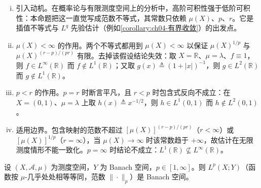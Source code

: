 \documentclass[../../main.tex]{subfiles}%
\begin{document}
\begin{remark}
\begin{enumerate}[(i)]
\item 引入动机。在概率论与有限测度空间上的分析中，高阶可积性强于低阶可积性：本命题把这一直觉写成范数不等式，其常数只依赖 $\mu(X)$、$p$、$r$。它是插值不等式与 $L^q$ 先验估计（例如\cref{corollary:ch04-有界收敛}）的出发点。

\item $\mu(X)<\infty$ 的作用。两个不等式都用到 $\mu(X)<\infty$ 以保证 $\mu(X)^{1/p}$ 与 $\mu(X)^{(r-p)/(pr)}$ 有限。去掉该假设结论失效：取 $X=\mathbb{R}$、$\mu=\lambda$、$f\equiv1$，则 $f\in L^\infty(\mathbb{R})$ 而 $f\notin L^1(\mathbb{R})$；又取 $g(x)\triangleq(1+|x|)^{-1}$，则 $g\in L^2(\mathbb{R})$ 而 $g\notin L^1(\mathbb{R})$。

\item $p<r$ 的作用。$p=r$ 时断言平凡，且 $r<p$ 时包含式反向不成立：在 $X=(0,1)$、$\mu=\lambda$ 上取 $h(x)\triangleq x^{-1/2}$，则 $h\in L^1(0,1)$ 而 $h\notin L^2(0,1)$。

\item 适用边界。包含映射的范数不超过 $[\mu(X)]^{(r-p)/(pr)}$（$r<\infty$）或 $[\mu(X)]^{1/p}$（$r=\infty$），当 $\mu(X)\to\infty$ 时该常数趋于 $+\infty$，故估计在无限测度情形不能一致化。$p=\infty$ 时结论不成立：$L^1(\mathbb{R})\not\subseteq L^\infty(\mathbb{R})$。
\end{enumerate}
\end{remark}

\begin{theorem}\label{theorem:ch04-Lp完备}
设 $(X,\mathcal{A},\mu)$ 为测度空间，$Y$ 为 Banach 空间，$p\in[1,\infty]$。则 $L^p(X;Y)$（函数按 $\mu$-几乎处处相等等同，范数 $\|\cdot\|_p$）是 Banach 空间。
\end{theorem}
\end{document}
